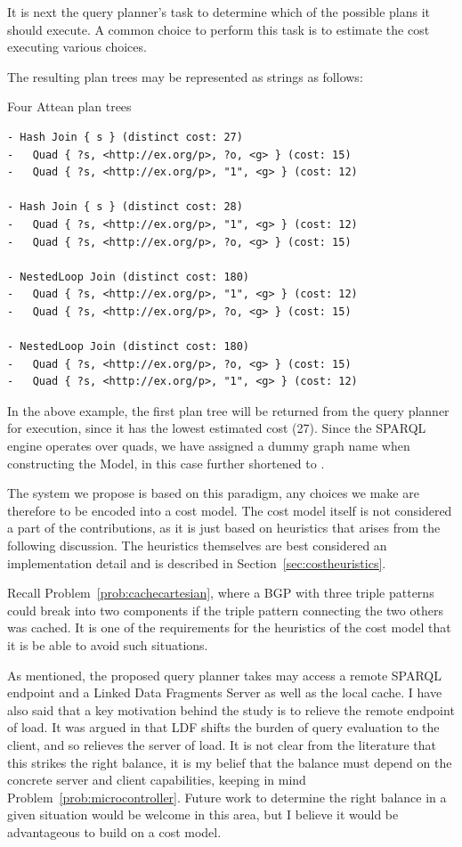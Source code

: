 It is next the query planner's task to determine which of the possible
plans it should execute. A common choice to perform this task is to
estimate the cost executing various choices.

The resulting plan trees may be represented as strings as follows:
\begin{example}{Four Attean plan trees}
\small
\begin{verbatim}
- Hash Join { s } (distinct cost: 27)
-   Quad { ?s, <http://ex.org/p>, ?o, <g> } (cost: 15)
-   Quad { ?s, <http://ex.org/p>, "1", <g> } (cost: 12)

- Hash Join { s } (distinct cost: 28)
-   Quad { ?s, <http://ex.org/p>, "1", <g> } (cost: 12)
-   Quad { ?s, <http://ex.org/p>, ?o, <g> } (cost: 15)

- NestedLoop Join (distinct cost: 180)
-   Quad { ?s, <http://ex.org/p>, "1", <g> } (cost: 12)
-   Quad { ?s, <http://ex.org/p>, ?o, <g> } (cost: 15)

- NestedLoop Join (distinct cost: 180)
-   Quad { ?s, <http://ex.org/p>, ?o, <g> } (cost: 15)
-   Quad { ?s, <http://ex.org/p>, "1", <g> } (cost: 12)
\end{verbatim}
\normalsize
\end{example}
In the above example, the first plan tree will be returned from the
query planner for execution, since it has the lowest estimated cost
(27). Since the SPARQL engine operates over quads, we have assigned a
dummy graph name when constructing the Model, in this case further
shortened to .


The system we propose is based on this paradigm, any choices we make
are therefore to be encoded into a cost model. The cost model itself
is not considered a part of the contributions, as it is just
based on heuristics that arises from the following
discussion. The heuristics themselves are best considered an
implementation detail and is described in
Section~\ref{sec:costheuristics}.

Recall Problem~\ref{prob:cachecartesian}, where a BGP with three
triple patterns could break into two components if the triple pattern
connecting the two others was cached. It is one of the requirements
for the heuristics of the cost model that it is be able to avoid such
situations.

As mentioned, the proposed query planner takes may access a remote
SPARQL endpoint and a Linked Data Fragments Server as well as the
local cache. I have also said that a key motivation behind the study
is to relieve the remote endpoint of load. It was argued in
\cite{verborgh2014querying} that LDF shifts the burden of query
evaluation to the client, and so relieves the server of load. It is
not clear from the literature that this strikes the right balance, it
is my belief that the balance must depend on the concrete server and
client capabilities, keeping in mind
Problem~\ref{prob:microcontroller}. Future work to determine the right
balance in a given situation would be welcome in this area, but I
believe it would be advantageous to build on a cost model.

